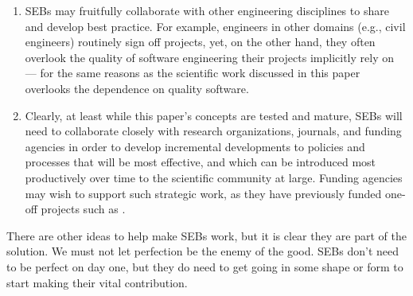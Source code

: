\documentclass{article}
\begin{document}
\begin{enumerate}
\item
SEBs may fruitfully collaborate with other engineering disciplines to share and develop best practice. For example, engineers in other domains (e.g., civil engineers) routinely sign off projects, yet, on the other hand, they often overlook the quality of software engineering their projects implicitly rely on  --- for the same reasons as the scientific work discussed in this paper overlooks the dependence on quality software.

\item
Clearly, at least while this paper's concepts are tested and mature, SEBs will need to collaborate closely with research organizations, journals, and funding agencies in order to develop incremental developments to policies and processes that will be most effective, and which can be introduced most productively over time to the scientific community at large. Funding agencies may wish to support such strategic work, as they have previously funded one-off projects such as \cite{cosmos}.
\end{enumerate}
There are other ideas to help make SEBs work, but it is clear they are part of the solution. We must not let perfection be the enemy of the good. SEBs don't need to be perfect on day one, but they do need to get going in some shape or form to start making their vital contribution.

\end{document}
